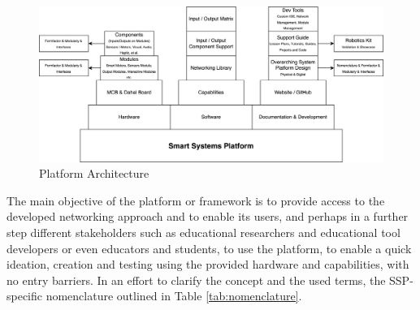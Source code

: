 \begin{figure}[H]
    \centering
    \includegraphics[width=\linewidth]{overleaf/images/Smart Systems Platform.drawio.png}
    \vspace{\ftspace}
    \caption{Platform Architecture}
    \label{fig:met:ssp_architecture}
\end{figure}

The main objective of the platform or framework is to provide access to the developed networking approach and to enable its users, and perhaps in a further step different stakeholders such as educational researchers and educational tool developers or even educators and students, to use the platform, to enable a quick ideation, creation and testing using the provided hardware and capabilities, with no entry barriers.
In an effort to clarify the concept and the used terms, the SSP-specific nomenclature outlined in Table \ref{tab:nomenclature}.

